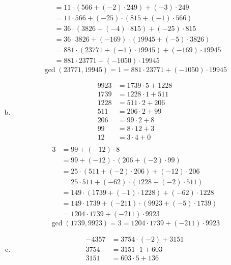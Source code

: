 \documentclass[a4paper,11pt,twocolumn]{article}
\begin{document}
\begin{enumerate}[(a)]
\begin{align*}
            &= 11 \cdot (566 + (-2) \cdot 249) + (-3) \cdot 249 \\
            &= 11 \cdot 566 + (-25) \cdot (815 + (-1) \cdot 566) \\
            &= 36 \cdot (3826 + (-4) \cdot 815) + (-25) \cdot 815 \\
            &= 36 \cdot 3826 + (-169) \cdot (19945 + (-5) \cdot 3826) \\
            &= 881 \cdot (23771 + (-1) \cdot 19945) + (-169) \cdot 19945 \\
            &= 881 \cdot 23771 + (-1050) \cdot 19945
        \end{align*}
        $$ \gcd(23771, 19945) = 1 = 881 \cdot 23771 + (-1050) \cdot 19945 $$
    \item
        \begin{align*}
          9923 &= 1739 \cdot 5 + 1228 \\
          1739 &= 1228 \cdot 1 + 511 \\
          1228 &= 511 \cdot 2 + 206 \\
          511 &= 206 \cdot 2 + 99 \\
          206 &= 99 \cdot 2 + 8 \\
          99 &= 8 \cdot 12 + 3 \\
          12 &= 3 \cdot 4 + 0 \\
        \end{align*}
        \begin{align*}
          3 &= 99 + (-12) \cdot 8 \\
            &= 99 + (-12) \cdot (206 + (-2) \cdot 99) \\
            &= 25 \cdot (511 + (-2) \cdot 206) + (-12) \cdot 206 \\
            &= 25 \cdot 511 + (-62) \cdot (1228 + (-2) \cdot 511) \\
            &= 149 \cdot (1739 + (-1) \cdot 1228) + (-62) \cdot 1228 \\
            &= 149 \cdot 1739 + (-211) \cdot (9923 + (-5) \cdot 1739) \\
            &= 1204 \cdot 1739 + (-211) \cdot 9923
        \end{align*}
        $$ \gcd(1739, 9923) = 3 = 1204 \cdot 1739 + (-211) \cdot 9923 $$
    \item
        \begin{align*}
          -4357 &= 3754 \cdot (-2) + 3151 \\
          3754 &= 3151 \cdot 1 + 603 \\
          3151 &= 603 \cdot 5 + 136 \\

\end{align*}
\end{enumerate}
\end{document}
